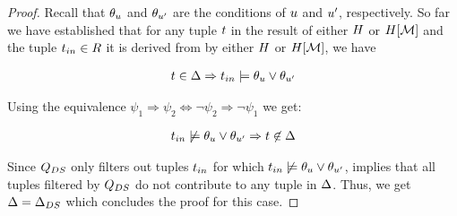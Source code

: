 \begin{proof}
 Recall that $\theta_{u}$ and $\theta_{u'}$  are the conditions of $u$ and $u'$, respectively.  So far we have established that for any tuple $t$ in the result of either $H$ or $H[\mathcal{M}]$ and the tuple $t_{in} \in R$ it is derived from by either $H$ or $H[\mathcal{M}]$, we have

 \begin{align}
t \in \Delta \Rightarrow t_{in} \models \theta_{u} \lor \theta_{u'}
 \end{align}

Using the equivalence $\psi_1 \Rightarrow \psi_2 \Leftrightarrow \neg \psi_2 \Rightarrow \neg \psi_1$ we get:

 \begin{align}
   t_{in} \not\models \theta_{u} \lor \theta_{u'} \Rightarrow t \not\in \Delta
    \label{eq:update-slicing-cond}
 \end{align}

Since $Q_{DS}$ only filters out tuples $t_{in}$ for which $t_{in} \not \models \theta_{u} \lor \theta_{u'}$,   implies that all tuples filtered by $Q_{DS}$ do not contribute to any tuple in $\Delta$. Thus, we get $\Delta = \Delta_{DS}$ which concludes the proof for this case.








\end{proof}
